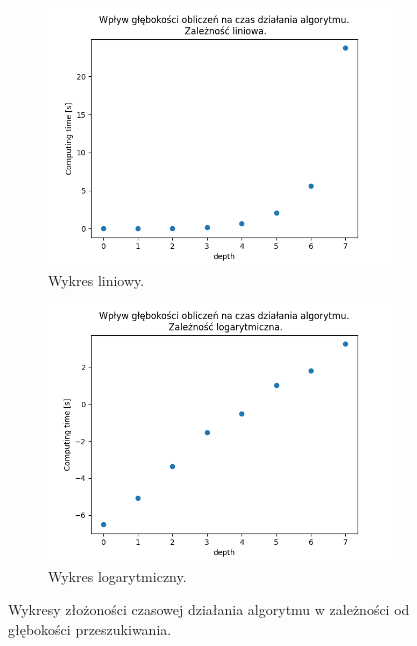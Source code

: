 \begin{figure}[h!]
	\centering
	\begin{subfigure}[b]{0.39\linewidth}
		\includegraphics[width=\linewidth]{photos/complexity_linear.png}
		\caption{Wykres liniowy.}
	\end{subfigure}
	\begin{subfigure}[b]{0.39\linewidth}
		\includegraphics[width=\linewidth]{photos/complexity_logarithmic.png}
		\caption{Wykres logarytmiczny.}
	\end{subfigure}
        \caption{Wykresy złożoności czasowej działania algorytmu w zależności
        od głębokości przeszukiwania.}
\end{figure}


